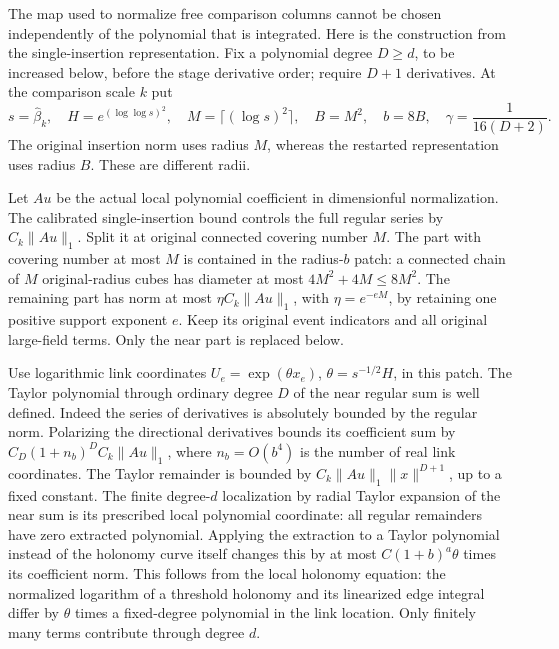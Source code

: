 The map used to normalize free comparison columns cannot be chosen
independently of the polynomial that is integrated.
Here is the construction from the single-insertion representation.
Fix a polynomial degree $D\ge d$, to be increased below, before the
stage derivative order; require $D+1$ derivatives.
At the comparison scale $k$ put
\[
 s=\widehat\beta_k,\quad H=e^{(\log\log s)^2},\quad
 M=\lceil(\log s)^2\rceil,\quad B=M^2,\quad b=8B,
 \quad \gamma=\frac1{16(D+2)}.
\]
%
The original insertion norm uses radius $M$, whereas the restarted
representation uses radius $B$. These are different radii.

Let $A u$ be the actual local polynomial coefficient in dimensionful
normalization. The calibrated single-insertion bound controls the full
regular series by $C_k\|Au\|_1$.
Split it at original connected covering number $M$.
The part with covering number at most $M$ is contained in the
radius-$b$ patch: a connected chain of $M$ original-radius cubes
has diameter at most $4M^2+4M\le8M^2$.
The remaining part has norm at most
$\eta C_k\|Au\|_1$, with $\eta=e^{-eM}$, by retaining one
positive support exponent $e$.
Keep its original event indicators and all original large-field terms.
Only the near part is replaced below.

Use logarithmic link coordinates $U_e=\exp(\theta x_e)$,
$\theta=s^{-1/2}H$, in this patch. The Taylor polynomial through
ordinary degree $D$ of the near regular sum is well defined.
Indeed the series of derivatives is absolutely bounded by the
regular norm. Polarizing the directional derivatives bounds its
coefficient sum by $C_D(1+n_b)^D C_k\|Au\|_1$, where
$n_b=O(b^4)$ is the number of real link coordinates.
The Taylor remainder is bounded by
$C_k\|Au\|_1\|x\|^{D+1}$, up to a fixed constant.
The finite degree-$d$ localization by radial Taylor expansion of the near sum is its
prescribed local polynomial coordinate: all regular remainders have
zero extracted polynomial. Applying the extraction to a Taylor polynomial instead of the
holonomy curve itself changes this by at most
$C(1+b)^a\theta$ times its coefficient norm.
This follows from the local holonomy equation: the normalized
logarithm of a threshold holonomy and its linearized edge
integral differ by $\theta$ times a fixed-degree polynomial
in the link location. Only finitely many terms contribute
through degree $d$.

